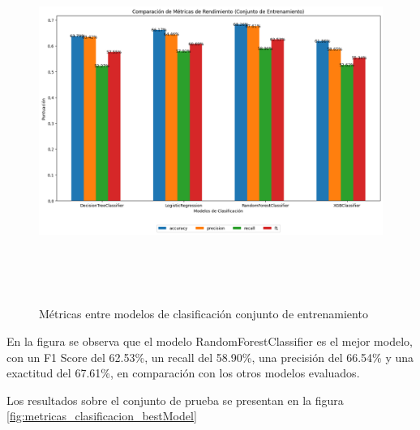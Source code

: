 \begin{figure}[H]
    \centering
    \includegraphics[width=7.06111in,height=4.68611in]{img/compara_algoritmos/metricasEntreModelosClasificacion.png}
    \caption{Métricas entre modelos de clasificación conjunto de entrenamiento}
    \label{fig:metricas_clasificacion}
\end{figure}

En la figura se observa que el modelo RandomForestClassifier es el mejor modelo, con un F1 Score del 62.53\%, un recall del 58.90\%, una precisión del 66.54\% y una exactitud del 67.61\%, en comparación con los otros modelos evaluados.

Los resultados sobre el conjunto de prueba se presentan en la figura \ref{fig:metricas_clasificacion_bestModel}

